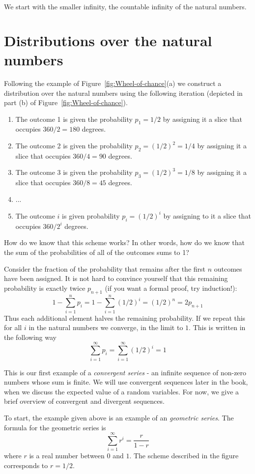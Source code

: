 We start with the smaller infinity, the countable infinity of the natural numbers.

\section{Distributions over the natural numbers}
Following the example of Figure~\ref{fig:Wheel-of-chance}(a) we
construct a distribution over the natural numbers using the following
iteration (depicted in part (b) of Figure~\ref{fig:Wheel-of-chance}).
\begin{enumerate}
\item The outcome 1 is given the probability $p_1=1/2$ by assigning it a
  slice that occupies $360/2 = 180$ degrees.
\item The outcome 2 is given the probability $p_2=(1/2)^2=1/4$ by
  assigning it a slice that occupies $360/4=90$ degrees. 
\item The outcome 3 is given the probability $p_3=(1/2)^3=1/8$ by
  assigning it a slice that occupies $360/8=45$ degrees.
\item ...
\item The outcome $i$ is given probability $p_i=(1/2)^i$ by assigning to
  it a slice that occupies $360/2^i$ degrees. 
\end{enumerate}

How do we know that this scheme works? In other words, how do we know
that the sum of the probabilities of all of the outcomes sums to 1?

Consider the fraction of the probability that remains after the first
$n$ outcomes have been assigned. It is not hard to convince yourself
that this remaining probability is exactly twice $p_{n+1}$ (if you
want a formal proof, try induction!):
\[
1-\sum_{i=1}^n p_i = 1-\sum_{i=1}^n (1/2)^i = (1/2)^n= 2p_{n+1}
\]
Thus each additional element halves the remaining probability. If we
repeat this for all $i$ in the natural numbers we converge, in the
limit to $1$. This is written in the following way
\[
\sum_{i=1}^{\infty} p_i = \sum_{i=1}^{\infty} (1/2)^i = 1
\]

This is our first example of a {\em convergent series} - an infinite
sequence of non-zero numbers whose sum is finite. We will use
convergent sequences later in the book, when we discuss the expected
value of a random variables. For now, we give a brief overview of
convergent and divergent sequences.

To start, the example given above is an example of an {\em geometric
  series}. The formula for the geometric series is 
\[
\sum_{i=1}^{\infty} r^i = \frac{r}{1-r}
\]
where $r$ is a real number between $0$ and $1$. 
The scheme described in the figure corresponds to $r=1/2$.

